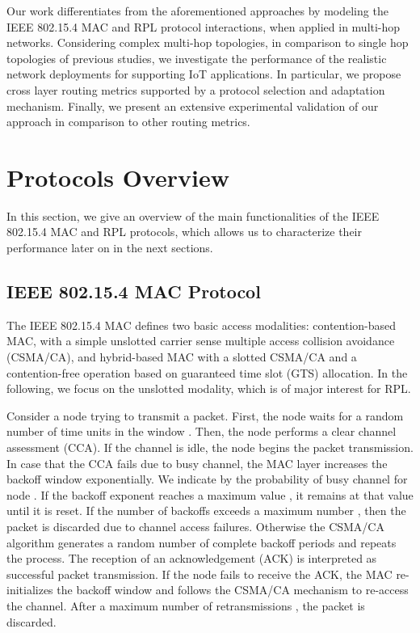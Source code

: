 \documentclass[review, 1p, 11pt]{elsarticle}
\numberwithin{equation}{section}
\begin{document}
Our work differentiates from the aforementioned approaches by modeling the IEEE 802.15.4 MAC and RPL protocol interactions, when applied in multi-hop networks.  Considering complex multi-hop topologies, in comparison to single hop topologies of previous studies, we investigate the performance of the realistic network deployments for supporting IoT applications. In particular, we propose cross layer routing metrics supported by a protocol selection and adaptation mechanism. Finally, we present an extensive experimental validation of our approach in comparison to other routing metrics.


\section{Protocols Overview}\label{sec:over-uns}

In this section, we give an overview of the main functionalities of the IEEE 802.15.4 MAC and RPL protocols, which allows us to characterize their performance later on in the next sections.

\subsection{IEEE 802.15.4 MAC Protocol}\label{sec:mac}

The  IEEE 802.15.4 MAC defines two basic access
modalities: contention-based MAC, with a simple unslotted
carrier sense multiple access collision avoidance (CSMA/CA), and
hybrid-based MAC with a slotted CSMA/CA
and a contention-free operation based on guaranteed time slot (GTS) allocation.
In the following, we focus on the unslotted modality, which is of major interest for RPL.

Consider a node  trying to transmit a packet.
First, the node waits for a random number of time units in the window . Then, the
node performs a clear channel assessment (CCA). If the channel is
idle, the node begins the packet transmission. In case that the CCA
fails due to busy channel, the MAC layer increases the backoff window exponentially.
We indicate by  the probability of busy channel for node . If the backoff exponent
reaches a maximum value , it remains at that value until it is reset. If the number of backoffs exceeds
a maximum number , then the packet is discarded due to channel access failures.
Otherwise the CSMA/CA algorithm
generates a random number of complete backoff periods and repeats
the process.
The reception of an acknowledgement (ACK) is interpreted as successful packet
transmission. If the node fails to receive the ACK, the MAC re-initializes
the backoff window and follows the CSMA/CA mechanism to re-access
the channel. After a maximum number of retransmissions , the packet is discarded.
\end{document}
